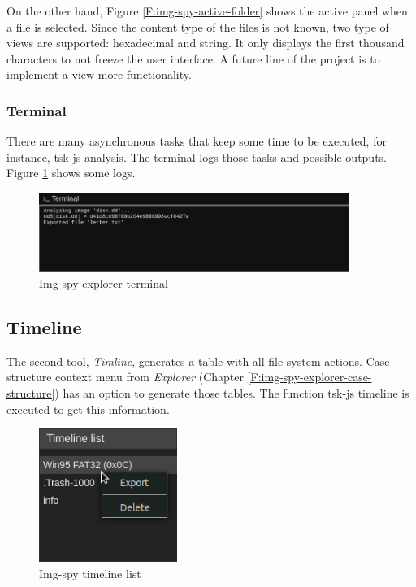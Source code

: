 On the other hand, Figure \ref{F:img-spy-active-folder} shows the active panel
when a file is selected. Since the content type of the files is not known,
two type of views are supported: hexadecimal and string. It only displays
the first thousand characters to not freeze the user interface. A future line
of the project is to implement a view more functionality.

\subsubsection{Terminal}

There are many asynchronous tasks that keep some time to be executed, for 
instance, tsk-js analysis. The terminal logs those tasks and possible outputs.
Figure \ref{F:img-spy-explorer-terminal} shows some logs.


\begin{figure}[htb]
	\begin{center}
		\includegraphics[width=0.9\textwidth]
		{./figures/explorer-terminal.png}
		\caption{Img-spy explorer terminal}
		\label{F:img-spy-explorer-terminal}
	\end{center}
\end{figure}

\subsection{Timeline}
\label{S:timeline}

The second tool, \textit{Timline}, generates a table with all file system
actions. Case structure context menu from \textit{Explorer} (Chapter
\ref{F:img-spy-explorer-case-structure}) has an option to generate those
tables. The function tsk-js timeline is executed to get this information.

\begin{figure}
	\includegraphics[width=4.5cm]
	{./figures/timeline-list.png}
	\centering
	\caption{Img-spy timeline list}
	\label{F:img-spy-timeline-list}
\end{figure}

